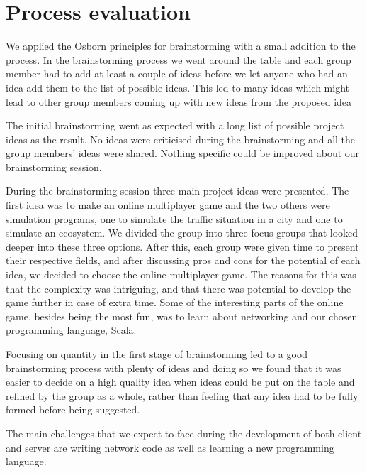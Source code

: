 \documentclass[a4paper]{article}
\begin{document}
\section{Process evaluation}
We applied the Osborn principles for brainstorming with a small addition to the process. In the brainstorming process we went around the table and each group member had 
to add at least a couple of ideas before we let anyone who had an idea add them to the list of possible ideas. This led to many ideas which might lead to other group members 
coming up with new ideas from the proposed idea

The initial brainstorming went as expected with a long list of possible project ideas as the result. No ideas were criticised during the brainstorming and all the group members' 
ideas were shared. Nothing specific could be improved about our brainstorming session. 

During the brainstorming session three main project ideas were presented. The first idea was to make an online multiplayer game and the two others were simulation programs, 
one to simulate the traffic situation in a city and one to simulate an ecosystem. We divided the group into three focus groups that looked deeper into these three options. 
After this, each group were given time to present their respective fields, and after discussing pros and cons for the potential of each idea, we decided to choose the online 
multiplayer game. The reasons for this was that the complexity was intriguing, and that there was potential to develop the game further in case of extra time. Some of the 
interesting parts of the online game, besides being the most fun, was to learn about networking and our chosen programming language, Scala. 

Focusing on quantity in the first stage of brainstorming led to a good brainstorming process with plenty of ideas and doing so we found that it was easier to decide on a high 
quality idea when ideas could be put on the table and refined by the group as a whole, rather than feeling that any idea had to be fully formed before being suggested.

The main challenges that we expect to face during the development of both client and server are writing network code as well as learning a new programming language.
\newpage
\end{document}
